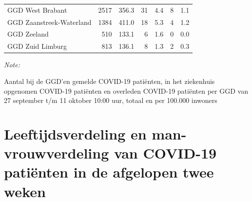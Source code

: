 \documentclass[
  english,
  man,floatsintext]{apa6}
\begin{document}
\begin{table}[H]
\begin{threeparttable}
\begin{tabular}{lrrrrrr}
GGD West Brabant & 2517 & 356.3 & 31 & 4.4 & 8 & 1.1\\
GGD Zaanstreek-Waterland & 1384 & 411.0 & 18 & 5.3 & 4 & 1.2\\
GGD Zeeland & 510 & 133.1 & 6 & 1.6 & 0 & 0.0\\
GGD Zuid Limburg & 813 & 136.1 & 8 & 1.3 & 2 & 0.3\\
\bottomrule
\end{tabular}
\begin{tablenotes}
\item \textit{Note: } 
\item Aantal bij de GGD’en gemelde COVID-19 patiënten, in het ziekenhuis opgenomen COVID-19 patiënten en overleden COVID-19 patiënten per GGD van 27 september t/m 11 oktober 10:00 uur, totaal en per 100.000 inwoners
\end{tablenotes}
\end{threeparttable}
\endgroup{}
\end{table}

\newpage

\hypertarget{leeftijdsverdeling-en-man-vrouwverdeling-van-covid-19-patiuxebnten-in-de-afgelopen-twee-weken}{%
\section{Leeftijdsverdeling en man-vrouwverdeling van COVID-19 patiënten in de afgelopen twee weken}\label{leeftijdsverdeling-en-man-vrouwverdeling-van-covid-19-patiuxebnten-in-de-afgelopen-twee-weken}}
\end{document}
